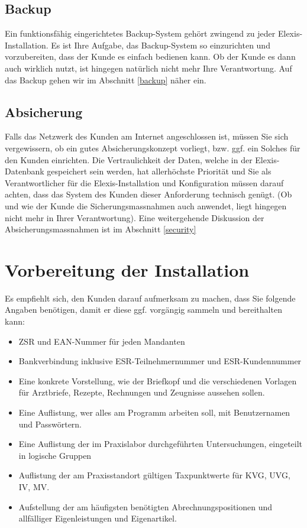 \documentclass[paper=a4,BCOR8.25mm,twoside]{scrartcl}
\begin{document}
\subsection{Backup}
Ein funktionsfähig eingerichtetes Backup-System gehört zwingend zu jeder Elexis-Installation. Es ist Ihre Aufgabe, das Backup-System so einzurichten und vorzubereiten, dass der Kunde es einfach bedienen kann. Ob der Kunde es dann auch wirklich nutzt, ist hingegen natürlich nicht mehr Ihre Verantwortung. Auf das Backup gehen wir im Abschnitt \ref{backup} näher ein.

\subsection{Absicherung}
Falls das Netzwerk des Kunden am Internet angeschlossen ist, müssen Sie sich vergewissern, ob ein gutes Absicherungskonzept vorliegt, bzw. ggf. ein Solches für den Kunden einrichten. Die Vertraulichkeit der Daten, welche in der Elexis-Datenbank gespeichert sein werden, hat allerhöchste Priorität und Sie als Verantwortlicher für die Elexis-Installation und Konfiguration müssen darauf achten, dass das System des Kunden dieser Anforderung technisch genügt. (Ob und wie der Kunde die Sicherungsmassnahmen auch anwendet, liegt hingegen nicht mehr in Ihrer Verantwortung). Eine weitergehende Diskussion der Absicherungsmassnahmen ist im Abschnitt \ref{security}

\section{Vorbereitung der Installation}
\label{besprechung}
Es empfiehlt sich, den Kunden darauf aufmerksam zu machen, dass Sie folgende Angaben benötigen, damit er diese ggf. vorgängig sammeln und bereithalten kann:
\begin{itemize}
    \item ZSR und EAN-Nummer für jeden Mandanten
    \item Bankverbindung inklusive ESR-Teilnehmernummer und ESR-Kundennummer
    \item Eine konkrete Vorstellung, wie der Briefkopf und die verschiedenen Vorlagen für Arztbriefe, Rezepte, Rechnungen und Zeugnisse aussehen sollen.
    \item Eine Auflistung, wer alles am Programm arbeiten soll, mit Benutzernamen und Passwörtern.
    \item Eine Auflistung der im Praxislabor durchgeführten Untersuchungen, eingeteilt in logische Gruppen
    \item Auflistung der am Praxisstandort gültigen Taxpunktwerte für KVG, UVG, IV, MV.
    \item Aufstellung der am häufigsten benötigten Abrechnungspositionen und allfälliger Eigenleistungen und Eigenartikel.
\end{itemize}
\end{document}
